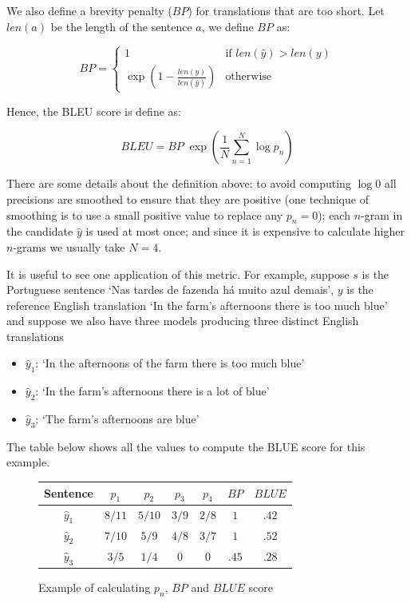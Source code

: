 We also define a brevity penalty ($BP$) for translations that are too short. Let $len(a)$ be the length of the sentence $a$, we define $BP$ as:

\begin{equation}
BP=
\begin{cases}
1 & \text{if } len(\hat{y}) > len(y) \\
\exp\left( 1 - \frac{len(y)}{len(\hat{y})} \right) & \text{otherwise}
\end{cases}
\end{equation} 


Hence, the BLEU score is define as:

\begin{equation}
BLEU = BP \; \exp \left(\frac{1}{N}  \sum_{n=1}^{N} \log p_n \right)
\end{equation}

There are some details about the definition above: to avoid computing $\log 0$ all precisions are smoothed to ensure that they are positive (one technique of smoothing is to use a small positive value to replace any $p_n=0$); each $n$-gram in the candidate $\hat{y}$ is used at most once; and since it is expensive to calculate higher $n$-grams we usually take $N=4$.

It is useful to see one application of this metric. For example, suppose $s$ is the Portuguese sentence `Nas tardes de fazenda há muito azul demais', $y$ is the reference English translation `In the farm's afternoons there is too much blue' and suppose we also have three models producing three distinct English translations 

\begin{itemize}
\item $\hat{y}_1$: `In the afternoons of the farm there is too much blue'
\item $\hat{y}_2$: `In the farm's afternoons there is a lot of blue'
\item $\hat{y}_3$: `The farm's afternoons are blue'
\end{itemize}


The table below shows all the values to compute the BLUE score for this example.

\begin{figure}[h]
\label{bluetable}
\begin{center}
\begin{tabular}{|c|c|c|c|c|c|c|}
\hline
\cellcolor{blue!10} Sentence & \cellcolor{blue!10} $p_1$ & \cellcolor{blue!10} $p_2$ & \cellcolor{blue!10} $p_3$ & \cellcolor{blue!10} $p_4$ & \cellcolor{blue!10} $BP$ & \cellcolor{blue!10} $BLUE$ \\ \hline
\cellcolor{blue!10} $\hat{y}_1$ & $8/11$ & $5/10$ & $3/9$ & $2/8$ & $1$ & $.42$\\ \hline
\cellcolor{blue!10} $\hat{y}_2$ & $7/10$ & $5/9$ & $4/8$ & $3/7$ & $1$ & $.52$\\ \hline
\cellcolor{blue!10} $\hat{y}_3$ & $3/5$ & $1/4$ & $0$ & $0$ & $.45$ & $.28$\\ \hline
\end{tabular}
\end{center}
\caption{Example of calculating $p_n$, $BP$ and $BLUE$ score}
\end{figure}

